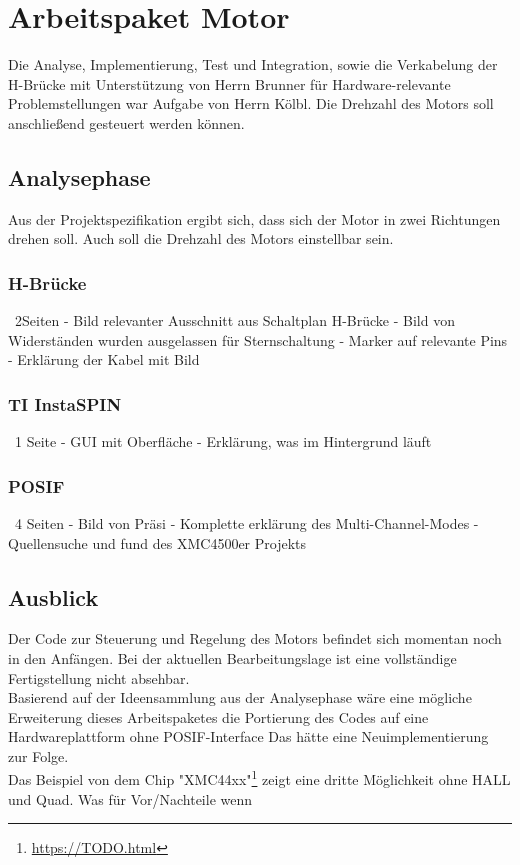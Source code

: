 \chapter{Arbeitspaket Motor}
Die Analyse, Implementierung, Test und Integration, sowie die Verkabelung der H-Brücke mit Unterst\"utzung von Herrn Brunner f\"ur Hardware-relevante Problemstellungen war Aufgabe von Herrn Kölbl. Die Drehzahl des Motors soll anschließend gesteuert werden können.

\section{Analysephase}
Aus der Projektspezifikation ergibt sich, dass sich der Motor in zwei Richtungen drehen soll. Auch soll die Drehzahl des Motors einstellbar sein.

\subsection{H-Br\"ucke} ~2Seiten
- Bild relevanter Ausschnitt aus Schaltplan H-Brücke
- Bild von Widerständen wurden ausgelassen für Sternschaltung
- Marker auf relevante Pins
- Erklärung der Kabel mit Bild
\subsection{TI InstaSPIN} ~1 Seite
- GUI mit Oberfläche
- Erklärung, was im Hintergrund läuft
\subsection{POSIF} ~4 Seiten
- Bild von Präsi
- Komplette erklärung des Multi-Channel-Modes
- Quellensuche und fund des XMC4500er Projekts

\section{Ausblick}
Der Code zur Steuerung und Regelung des Motors befindet sich momentan noch in den Anfängen. Bei der aktuellen Bearbeitungslage ist eine vollständige Fertigstellung nicht absehbar. \\
Basierend auf der Ideensammlung aus der Analysephase wäre eine mögliche Erweiterung dieses Arbeitspaketes die Portierung des Codes auf eine Hardwareplattform ohne POSIF-Interface Das hätte eine Neuimplementierung zur Folge. \\
Das Beispiel von dem Chip "XMC44xx"\footnote{\url{https://TODO.html}} zeigt eine dritte Möglichkeit ohne HALL und Quad. Was für Vor/Nachteile wenn
